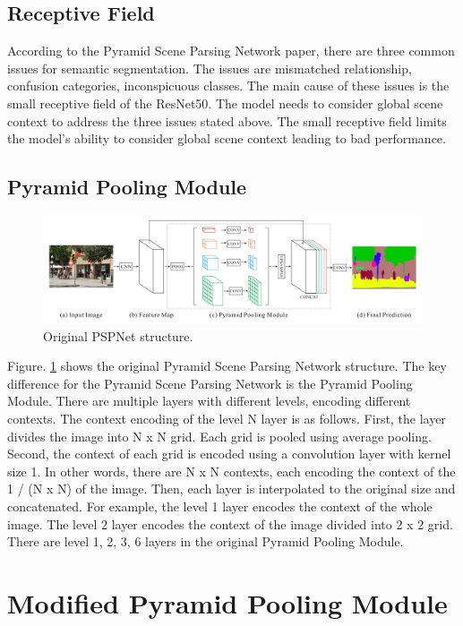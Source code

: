 \documentclass[10pt,twocolumn,letterpaper]{article}
\begin{document}
\subsection{Receptive Field}
According to the Pyramid Scene Parsing Network paper\cite{zhao2017pyramid}, there are three common issues for semantic segmentation. The issues are mismatched relationship, confusion categories, inconspicuous classes. The main cause of these issues is the small receptive field of the ResNet50\cite{he2015deep}. The model needs to consider global scene context to address the three issues stated above. The small receptive field limits the model's ability to consider global scene context leading to bad performance.

\subsection{Pyramid Pooling Module}
\begin{figure}[t]
  \centering
  \includegraphics[width=\linewidth]{figures/PSPNet.png}
  \caption{Original PSPNet\cite{zhao2017pyramid} structure.}
  \label{fig:PSPNet}
\end{figure}
Figure. \ref{fig:PSPNet} shows the original Pyramid Scene Parsing Network structure. The key difference for the Pyramid Scene Parsing Network is the Pyramid Pooling Module. There are multiple layers with different levels, encoding different contexts. The context encoding of the level N layer is as follows. First, the layer divides the image into N x N grid. Each grid is pooled using average pooling. Second, the context of each grid is encoded using a convolution layer with kernel size 1. In other words, there are N x N contexts, each encoding the context of the 1 / (N x N) of the image. Then, each layer is interpolated to the original size and concatenated. For example, the level 1 layer encodes the context of the whole image. The level 2 layer encodes the context of the image divided into 2 x 2 grid. There are level 1, 2, 3, 6 layers in the original Pyramid Pooling Module.

\section{Modified Pyramid Pooling Module}
\label{sec:modified_PSPNet}
\end{document}
